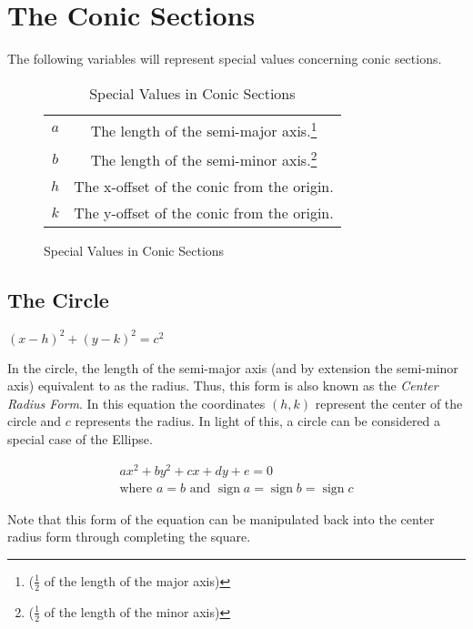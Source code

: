 \documentclass[11pt,letterpaper]{report}
\DeclareMathOperator{\sign}{sign}
\begin{document}
\section*{The Conic Sections}
The following variables will represent special values concerning conic sections.
\begin{figure}[H]
    \begin{minipage}{\textwidth}
        \begin{table}[H]
        \caption{Special Values in Conic Sections}
        \centering
        \begin{tabular}{c c}
        \hline
        $a$ & The length of the semi-major axis.\footnote{($\frac{1}{2}$ of the length of the major axis)}\\
        $b$ & The length of the semi-minor axis.\footnote{($\frac{1}{2}$ of the length of the minor axis)}\\
        $h$ & The x-offset of the conic from the origin.\\
        $k$ & The y-offset of the conic from the origin.\\
        \hline
        \end{tabular}
        \label{table:SpecValsConics}
        \end{table}
    \end{minipage}
\end{figure}

\subsection*{The Circle}
\begin{defn}
$\displaystyle{(x-h)^{2}+(y-k)^{2}=c^{2}}$
\end{defn}
In the circle, the length of the semi-major axis (and by extension the semi-minor axis) equivalent to as the radius. Thus, this form is also known as the \emph{Center Radius Form}. In this equation the coordinates $(h,k)$ represent the center of the circle and $c$ represents the radius. In light of this, a circle can be considered a special case of the Ellipse.

\begin{defn}
\begin{gather*}
\displaystyle{ax^{2}+by^{2}+cx+dy+e=0}\\
\text{where $a=b$ and $\sign{a}=\sign{b}=\sign{c}$}
\end{gather*}
\end{defn}
Note that this form of the equation can be manipulated back into the center radius form through completing the square.
\end{document}
